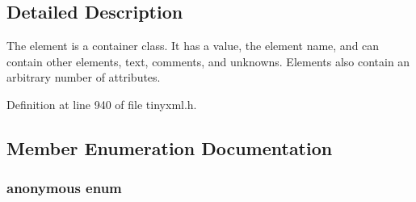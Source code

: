 \subsection{Detailed Description}
The element is a container class. It has a value, the element name, and can contain other elements, text, comments, and unknowns. Elements also contain an arbitrary number of attributes. 

Definition at line 940 of file tinyxml.h.



\subsection{Member Enumeration Documentation}
\hypertarget{classTiXmlBase_a9a7e9344415956ab96e8c75f6a0bbd48}{
\subsubsection[{"@1}]{\setlength{\rightskip}{0pt plus 5cm}anonymous enum}}
\label{d8/d47/classTiXmlBase_a9a7e9344415956ab96e8c75f6a0bbd48}
